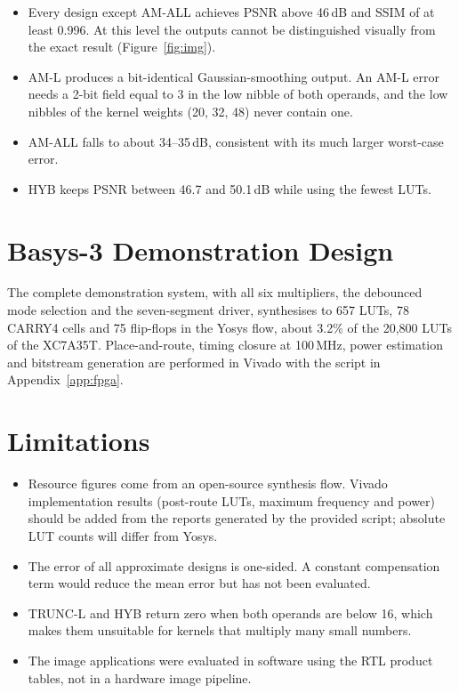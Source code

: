 \documentclass[12pt,a4paper,oneside]{report}
\begin{document}
\begin{itemize}
\item Every design except AM-ALL achieves PSNR above 46\,dB and SSIM of at least 0.996. At this level the outputs cannot be distinguished visually from the exact result (Figure~\ref{fig:img}).
\item AM-L produces a bit-identical Gaussian-smoothing output. An AM-L error needs a 2-bit field equal to 3 in the low nibble of both operands, and the low nibbles of the kernel weights (20, 32, 48) never contain one.
\item AM-ALL falls to about 34--35\,dB, consistent with its much larger worst-case error.
\item HYB keeps PSNR between 46.7 and 50.1\,dB while using the fewest LUTs.
\end{itemize}

\section{Basys-3 Demonstration Design}
The complete demonstration system, with all six multipliers, the debounced mode selection and the seven-segment driver, synthesises to 657 LUTs, 78 CARRY4 cells and 75 flip-flops in the Yosys flow, about 3.2\% of the 20{,}800 LUTs of the XC7A35T. Place-and-route, timing closure at 100\,MHz, power estimation and bitstream generation are performed in Vivado with the script in Appendix~\ref{app:fpga}.

\section{Limitations}
\begin{itemize}
\item Resource figures come from an open-source synthesis flow. Vivado implementation results (post-route LUTs, maximum frequency and power) should be added from the reports generated by the provided script; absolute LUT counts will differ from Yosys.
\item The error of all approximate designs is one-sided. A constant compensation term would reduce the mean error but has not been evaluated.
\item TRUNC-L and HYB return zero when both operands are below 16, which makes them unsuitable for kernels that multiply many small numbers.
\item The image applications were evaluated in software using the RTL product tables, not in a hardware image pipeline.
\end{itemize}
\end{document}
